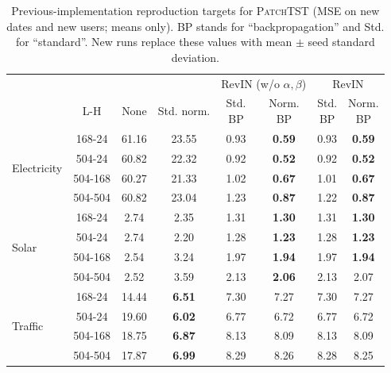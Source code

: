 \begin{table}[t]
\caption{Previous-implementation reproduction targets for \textsc{PatchTST}
(MSE on new dates and new users; means only). BP stands for ``backpropagation''
and Std. for ``standard''. New runs replace these values with mean $\pm$ seed
standard deviation.}
\centering
\setlength{\tabcolsep}{1.5pt}
\begin{tabular}{lccccccc}
\toprule
& & & & \multicolumn{2}{c}{RevIN (w/o $\alpha,\beta$)} & \multicolumn{2}{c}{RevIN} \\
     \cmidrule(r){5-6} \cmidrule(r){7-8}
 & L-H & None & Std. norm. & \thead{Std.\\BP} & \thead{Norm.\\BP} & \thead{Std.\\BP} & \thead{Norm.\\BP} \\
\midrule
\multirow{4}{*}{Electricity} & 168-24 & 61.16 & 23.55 & 0.93 & \textbf{0.59} & 0.93 & \textbf{0.59} \\
 & 504-24 & 60.82 & 22.32 & 0.92 & \textbf{0.52} & 0.92 &\textbf{ 0.52} \\
 & 504-168 & 60.27 & 21.33 & 1.02 & \textbf{0.67} & 1.01 & \textbf{0.67} \\
 & 504-504 & 60.82 & 23.04 & 1.23 & \textbf{0.87} & 1.22 & \textbf{0.87} \\
\midrule
\multirow{4}{*}{Solar} & 168-24 & 2.74 & 2.35 & 1.31 & \textbf{1.30} & 1.31 & \textbf{1.30} \\
 & 504-24 & 2.74 & 2.20 & 1.28 & \textbf{1.23} & 1.28 &\textbf{ 1.23} \\
 & 504-168 & 2.54 & 3.24 & 1.97 & \textbf{1.94} & 1.97 & \textbf{1.94} \\
 & 504-504 & 2.52 & 3.59 & 2.13 & \textbf{2.06} & 2.13 & 2.07 \\
\midrule
\multirow{4}{*}{Traffic} & 168-24 & 14.44 & \textbf{6.51} & 7.30 & 7.27 & 7.30 & 7.27 \\
 & 504-24 & 19.60 & \textbf{6.02} & 6.77 & 6.72 & 6.77 & 6.72 \\
 & 504-168 & 18.75 & \textbf{6.87} & 8.13 & 8.09 & 8.13 & 8.09 \\
 & 504-504 & 17.87 & \textbf{6.99} & 8.29 & 8.26 & 8.28 & 8.25 \\
\bottomrule
\end{tabular}
\label{tab:main2}
\end{table}
